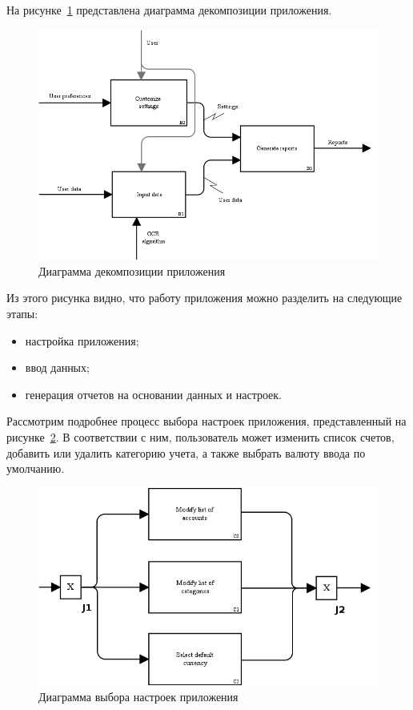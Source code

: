 \pagebreak
На рисунке~\ref{fig:idef0_app} представлена диаграмма декомпозиции
приложения.

\begin{figure}[h!]
  \centering
  \includegraphics[width=150mm]{pic/idef0_app}
  \caption{Диаграмма декомпозиции приложения}
  \label{fig:idef0_app}
\end{figure}

Из этого рисунка видно, что работу приложения можно разделить
на следующие этапы:
\begin{itemize}
\item настройка приложения;
\item ввод данных;
\item генерация отчетов на основании данных и настроек.
\end{itemize}

\pagebreak
Рассмотрим подробнее процесс выбора настроек приложения,
представленный на рисунке~\ref{fig:idef3_settings}.
В соответствии с ним, пользователь может изменить список счетов,
добавить или удалить категорию учета, а также выбрать валюту ввода
по умолчанию.

\begin{figure}[h!]
  \centering
  \includegraphics[width=150mm]{pic/idef3_settings}
  \caption{Диаграмма выбора настроек приложения}
  \label{fig:idef3_settings}
\end{figure}

